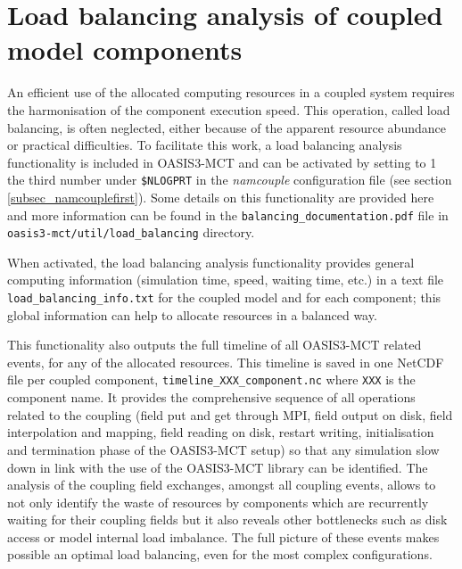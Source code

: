 \section{Load balancing analysis of coupled model components}
\label{lucia}

  An efficient use of the allocated computing resources in a coupled system requires the harmonisation of the component execution speed. This operation, called load balancing, is often neglected, either because of the apparent resource abundance or practical difficulties.
 To facilitate this work, a load balancing analysis functionality is included in OASIS3-MCT and can be activated by setting to 1 the third number under {\tt \$NLOGPRT} in the  {\it namcouple} configuration file (see section \ref{subsec_namcouplefirst}). Some details on this functionality are provided here and more information can be found in the {\tt balancing\_documentation.pdf} file in {\tt
  oasis3-mct/util/load\_balancing} directory.

  When activated, the load balancing analysis functionality provides general computing information (simulation time, speed, waiting time, etc.) in a text file {\tt load\_balancing\_info.txt} for the coupled model and for each component; this global information can help to allocate resources in a balanced way. 

This functionality also outputs the full timeline of all OASIS3-MCT related events, for any of the allocated resources. This timeline is saved in one NetCDF file per coupled component, {\tt timeline\_XXX\_component.nc} where {\tt XXX} is the component name. It provides the comprehensive sequence of all operations related to the coupling (field put and get through MPI, field output on disk, field interpolation and mapping, field reading on disk, restart writing, initialisation and termination phase of the OASIS3-MCT setup) so that any simulation slow down in link with the use of the OASIS3-MCT library can be identified.
 The analysis of the coupling field exchanges, amongst all coupling events, allows to not only identify the waste of resources by components which are recurrently waiting for their coupling fields but it also reveals other bottlenecks such as disk access or model internal load imbalance. The full picture of these events makes possible an optimal load balancing, even for the most complex configurations.

